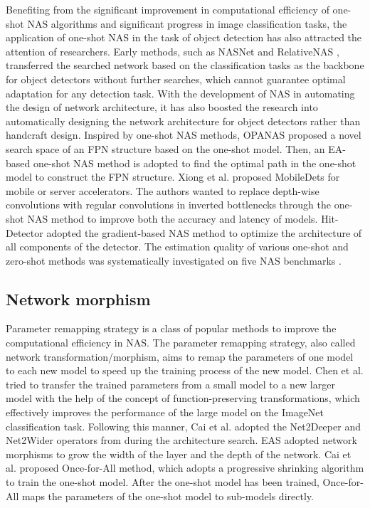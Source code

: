 \documentclass[journal]{IEEEtran}
\begin{document}
Benefiting from the significant improvement in computational efficiency of one-shot NAS algorithms and significant progress in image classification tasks, the application of one-shot NAS in the task of object detection has also attracted the attention of researchers. Early methods, such as NASNet \cite{zoph2018learning} and RelativeNAS \cite{9488309}, transferred the searched network based on the classification tasks as the backbone for object detectors without further searches, which cannot guarantee optimal adaptation for any detection task. With the development of NAS in automating the design of network architecture, it has also boosted the research into automatically designing the network architecture for object detectors rather than handcraft design. Inspired by one-shot NAS methods, OPANAS \cite{liang2021opanas} proposed a novel search space of an FPN structure based on the one-shot model. Then, an EA-based one-shot NAS method is adopted to find the optimal path in the one-shot model to construct the FPN structure. Xiong et al. \cite{xiong2021mobiledets} proposed MobileDets for mobile or server accelerators. The authors wanted to replace depth-wise convolutions with regular convolutions in inverted bottlenecks through the one-shot NAS method to improve both the accuracy and latency of models. Hit-Detector \cite{guo2020hit} adopted the gradient-based NAS method \cite{liu2018darts} to optimize the architecture of all components of the detector. The estimation quality of various one-shot and zero-shot methods was systematically investigated on five NAS benchmarks \cite{ning2021evaluating}.

\subsection{Network morphism}
Parameter remapping strategy is a class of popular methods to improve the computational efficiency in NAS. The parameter remapping strategy, also called network transformation/morphism, aims to remap the parameters of one model to each new model to speed up the training process of the new model. Chen et al. \cite{chen2015net2net} tried to transfer the trained parameters from a small model to a new larger model with the help of the concept of function-preserving transformations, which effectively improves the performance of the large model on the ImageNet classification task. Following this manner, Cai et al. \cite{cai2017reinforcement} adopted the Net2Deeper and Net2Wider operators from \cite{chen2015net2net} during the architecture search. EAS \cite{cai2018efficient} adopted network morphisms to grow the width of the layer and the depth of the network. Cai et al. \cite{cai2019once} proposed Once-for-All method, which adopts a progressive shrinking algorithm to train the one-shot model. After the one-shot model has been trained, Once-for-All maps the parameters of the one-shot model to sub-models directly. 
\end{document}
